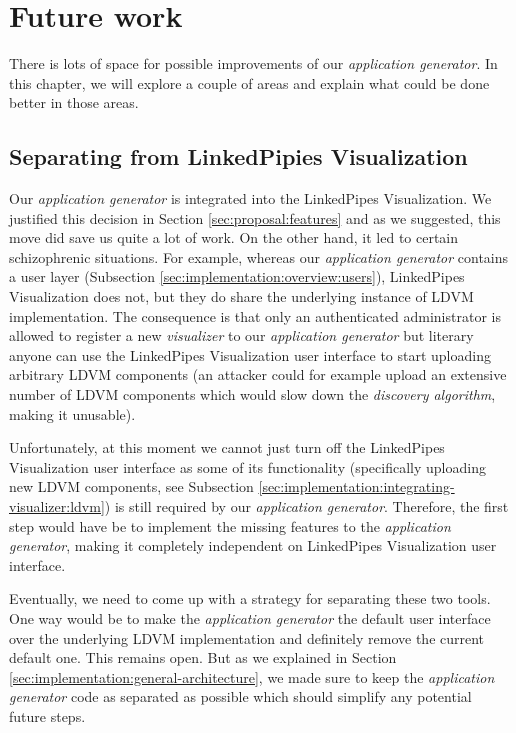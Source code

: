 \chapter{Future work}

There is lots of space for possible improvements of our \emph{application generator}. In this chapter, we will explore a couple of areas and explain what could be done better in those areas.

\section{Separating from LinkedPipies Visualization}

Our \emph{application generator} is integrated into the LinkedPipes Visualization. We justified this decision in Section \ref{sec:proposal:features} and as we suggested, this move did save us quite a lot of work. On the other hand, it led to certain schizophrenic situations. For example, whereas our \emph{application generator} contains a user layer (Subsection \ref{sec:implementation:overview:users}), LinkedPipes Visualization does not, but they do share the underlying instance of LDVM implementation. The consequence is that only an authenticated administrator is allowed to register a new \emph{visualizer} to our \emph{application generator} but literary anyone can use the LinkedPipes Visualization user interface to start uploading arbitrary LDVM components (an attacker could for example upload an extensive number of LDVM components which would slow down the \emph{discovery algorithm}, making it unusable).

Unfortunately, at this moment we cannot just turn off the LinkedPipes Visualization user interface as some of its functionality (specifically uploading new LDVM components, see Subsection \ref{sec:implementation:integrating-visualizer:ldvm}) is still required by our \emph{application generator}. Therefore, the first step would have be to implement the missing features to the \emph{application generator}, making it completely independent on LinkedPipes Visualization user interface.

Eventually, we need to come up with a strategy for separating these two tools. One way would be to make the \emph{application generator} the default user interface over the underlying LDVM implementation and definitely remove the current default one. This remains open. But as we explained in Section \ref{sec:implementation:general-architecture}, we made sure to keep the \emph{application generator} code as separated as possible which should simplify any potential future steps. 

